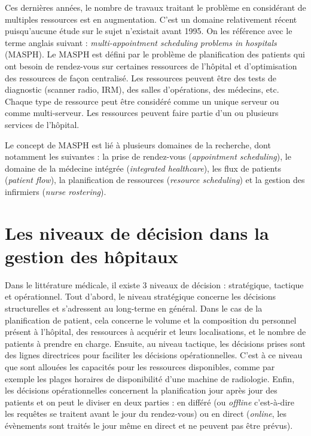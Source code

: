 \documentclass[noposter]{polytech/polytech}
\begin{document}
Ces dernières années, le nombre de travaux traitant le problème en considérant de multiples ressources est en augmentation. C'est un domaine relativement récent puisqu'aucune étude sur le sujet n'existait avant 1995. On les référence avec le terme anglais suivant : \textit{multi-appointment scheduling problems in hospitals} (MASPH). Le MASPH est défini par le problème de planification des patients qui ont besoin de rendez-vous sur certaines ressources de l'hôpital et d'optimisation des ressources de façon centralisé. Les ressources peuvent être des tests de diagnostic (scanner radio, IRM), des salles d'opérations, des médecins, etc. Chaque type de ressource peut être considéré comme un unique serveur ou comme multi-serveur. Les ressources peuvent faire partie d'un ou plusieurs services de l'hôpital. 

Le concept de MASPH est lié à plusieurs domaines de la recherche, dont notamment les suivantes : la prise de rendez-vous (\textit{appointment scheduling}), le domaine de la médecine intégrée (\textit{integrated healthcare}), les flux de patients (\textit{patient flow}), la planification de ressources (\textit{resource scheduling}) et la gestion des infirmiers (\textit{nurse rostering}). 


\section{Les niveaux de décision dans la gestion des hôpitaux}

Dans le littérature médicale, il existe 3 niveaux de décision : stratégique, tactique et opérationnel. Tout d'abord, le niveau stratégique concerne les décisions structurelles et s'adressent au long-terme en général. Dans le cas de la planification de patient, cela concerne le volume et la composition du personnel présent à l'hôpital, des ressources à acquérir et leurs localisations, et le nombre de patients à prendre en charge. Ensuite, au niveau tactique, les décisions prises sont des lignes directrices pour faciliter les décisions opérationnelles. C'est à ce niveau que sont allouées les capacités pour les ressources disponibles, comme par exemple les plages horaires de disponibilité d'une machine de radiologie. Enfin, les décisions opérationnelles concernent la planification jour après jour des patients et on peut le diviser en deux parties : en différé (ou \textit{offline} c'est-à-dire les requêtes se traitent avant le jour du rendez-vous) ou en direct (\textit{online}, les évènements sont traités le jour même en direct et ne peuvent pas être prévus). 
\end{document}
